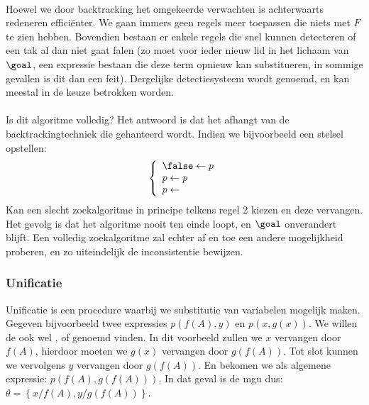 \paragraph{}
Hoewel we door backtracking het omgekeerde verwachten is achterwaarts redeneren efficiënter. We gaan immers geen regels meer toepassen die niets met $F$ te zien hebben. Bovendien bestaan er enkele regels die snel kunnen detecteren of een tak al dan niet gaat falen (zo moet voor ieder nieuw lid in het lichaam van $\goal$, een expressie bestaan die deze term opnieuw kan substitueren, in sommige gevallen is dit dan een feit). Dergelijke detectiesysteem wordt  genoemd, en kan meestal in de keuze betrokken worden.
\paragraph{}Is dit algoritme volledig? Het antwoord is dat het afhangt van de backtrackingtechniek die gehanteerd wordt. Indien we bijvoorbeeld een stelsel opstellen:
\begin{equation}
\left\{\begin{array}{l}
\false\leftarrow p\\
p\leftarrow p\\
p\leftarrow
\end{array}\right.
\end{equation}
Kan een slecht zoekalgoritme in principe telkens regel 2 kiezen en deze vervangen. Het gevolg is dat het algoritme nooit ten einde loopt, en $\goal$ onverandert blijft. Een volledig zoekalgoritme zal echter af en toe een andere mogelijkheid proberen, en zo uiteindelijk de inconsistentie bewijzen.
\subsubsection{Unificatie}
\label{sss:unification}
Unificatie is een procedure waarbij we substitutie van variabelen mogelijk maken. Gegeven bijvoorbeeld twee expressies $p\left(f\left(A\right),y\right)$ en $p\left(x,g\left(x\right)\right)$. We willen de  ook wel ,  of  genoemd vinden. In dit voorbeeld zullen we $x$ vervangen door $f\left(A\right)$, hierdoor moeten we $g\left(x\right)$ vervangen door $g\left(f\left(A\right)\right)$. Tot slot kunnen we vervolgens $y$ vervangen door $g\left(f\left(A\right)\right)$. En bekomen we als algemene expressie: $p\left(f\left(A\right),g\left(f\left(A\right)\right)\right)$. In dat geval is de mgu dus: $\theta=\left\{x/f\left(A\right),y/g\left(f\left(A\right)\right)\right\}$.
